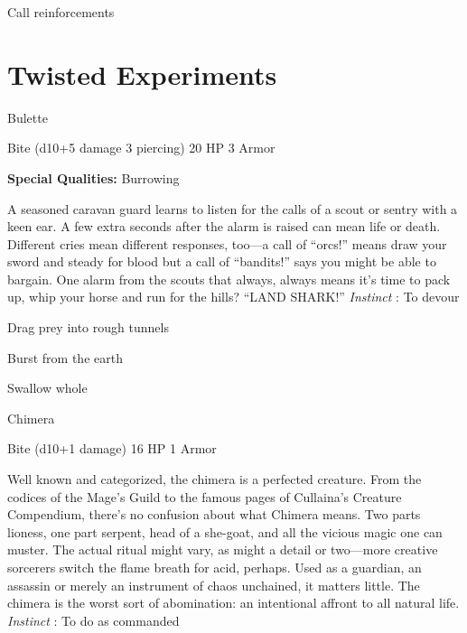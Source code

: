          
\item Call reinforcements

       
\stopitemize
                
\section{Twisted Experiments}    
            
\startMonsterName
Bulette	 
\stopMonsterName
       

Bite (d10+5 damage 3 piercing)	20 HP	3 Armor

       


       
\startMonsterQualities
         {\bf Special Qualities:}  Burrowing
\stopMonsterQualities
       
\startMonsterDescription
A seasoned caravan guard learns to listen for the calls of a scout or sentry with a keen ear. A few extra seconds after the alarm is raised can mean life or death. Different cries mean different responses, too—a call of “orcs!” means draw your sword and steady for blood but a call of “bandits!” says you might be able to bargain. One alarm from the scouts that always, always means it’s time to pack up, whip your horse and run for the hills? “LAND SHARK!” {\em Instinct} : To devour
\stopMonsterDescription
       
\startitemize[1,packed]
         
\item Drag prey into rough tunnels

         
\item Burst from the earth

         
\item Swallow whole

       
\stopitemize
       
\startMonsterName
Chimera	 
\stopMonsterName
       

Bite (d10+1 damage)	16 HP	1 Armor

       


       
\startMonsterDescription
Well known and categorized, the chimera is a perfected creature. From the codices of the Mage’s Guild to the famous pages of Cullaina’s Creature Compendium, there’s no confusion about what Chimera means. Two parts lioness, one part serpent, head of a she-goat, and all the vicious magic one can muster. The actual ritual might vary, as might a detail or two—more creative sorcerers switch the flame breath for acid, perhaps. Used as a guardian, an assassin or merely an instrument of chaos unchained, it matters little. The chimera is the worst sort of abomination: an intentional affront to all natural life. {\em Instinct} : To do as commanded
\stopMonsterDescription
       

